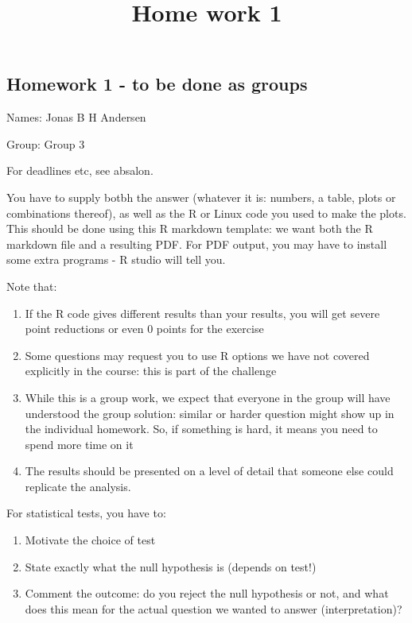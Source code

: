 \documentclass[]{article}
\title{Home work 1}
\author{}
\date{}
\begin{document}
\maketitle

\subsection{Homework 1 - to be done as
groups}\label{homework-1---to-be-done-as-groups}

Names: Jonas B H Andersen

Group: Group 3

For deadlines etc, see absalon.

You have to supply botbh the answer (whatever it is: numbers, a table,
plots or combinations thereof), as well as the R or Linux code you used
to make the plots. This should be done using this R markdown template:
we want both the R markdown file and a resulting PDF. For PDF output,
you may have to install some extra programs - R studio will tell you.

Note that:

\begin{enumerate}
\def\labelenumi{\arabic{enumi}.}
\item
  If the R code gives different results than your results, you will get
  severe point reductions or even 0 points for the exercise
\item
  Some questions may request you to use R options we have not covered
  explicitly in the course: this is part of the challenge
\item
  While this is a group work, we expect that everyone in the group will
  have understood the group solution: similar or harder question might
  show up in the individual homework. So, if something is hard, it means
  you need to spend more time on it
\item
  The results should be presented on a level of detail that someone else
  could replicate the analysis.
\end{enumerate}

For statistical tests, you have to:

\begin{enumerate}
\def\labelenumi{\arabic{enumi})}
\item
  Motivate the choice of test
\item
  State exactly what the null hypothesis is (depends on test!)
\item
  Comment the outcome: do you reject the null hypothesis or not, and
  what does this mean for the actual question we wanted to answer
  (interpretation)?
\end{enumerate}
\end{document}

